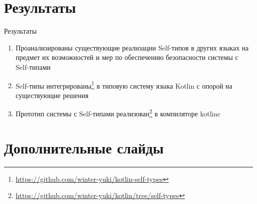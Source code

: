\documentclass[usenames, dvipsnames]{beamer}
\begin{document}
    \section{Результаты}

    \begin{frame}{Результаты}

        \begin{enumerate}
            \item Проанализированы существующие реализации Self-типов в других языках на предмет их возможностей и мер по обеспечению безопасности системы с Self-типами
            \item Self-типы интегрированы\footnote{\url{https://github.com/winter-yuki/kotlin-self-types}} в типовую систему языка Kotlin с опорой на существующие решения
            \item Прототип системы с Self-типами реализован\footnote{\url{https://github.com/winter-yuki/kotlin/tree/self-types}} в компиляторе kotlinc
        \end{enumerate}
    \end{frame}


    \appendix


    \section{Дополнительные слайды}
\end{document}
